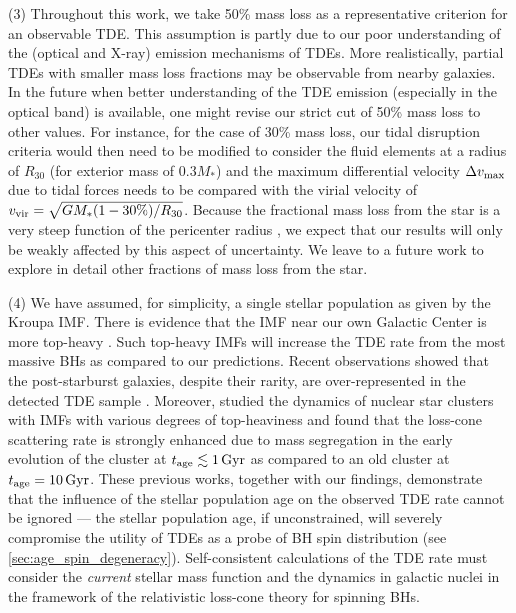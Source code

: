 \documentclass[useAMS,usenatbib]{mn2e}
\def\mstar{M_*}
\def\tage{t_{\rm age}}
\begin{document}
(3) Throughout this work, we take 50\% mass loss as a representative criterion for an observable TDE. This assumption is partly due to our poor understanding of the (optical and X-ray) emission mechanisms of TDEs. More realistically, partial TDEs with smaller mass loss fractions may be observable from nearby galaxies. In the future when better understanding of the TDE emission (especially in the optical band) is available, one might revise our strict cut of 50\% mass loss to other values. For instance, for the case of 30\% mass loss, our tidal disruption criteria would then need to be modified to consider the fluid elements at a radius of $R_{30}$ (for exterior mass of $0.3\mstar$) and the maximum differential velocity $\Delta v_{\rm max}$ due to tidal forces needs to be compared with the virial velocity of $v_{\rm vir} = \sqrt{GM_*(1-30\%)/R_{30}}$. Because the fractional mass loss from the star is a very steep function of the pericenter radius \citep{guillochon13_TDE_hydro, Ryu2020a}, we expect that our results will only be weakly affected by this aspect of uncertainty. We leave to a future work to explore in detail other fractions of mass loss from the star.

(4) We have assumed, for simplicity, a single stellar population as given by the Kroupa IMF. There is evidence that the IMF near our own Galactic Center is more top-heavy \citep{lu13_top_heavy_IMF}. Such top-heavy IMFs will increase the TDE rate from the most massive BHs as compared to our predictions. Recent observations showed that the post-starburst galaxies, despite their rarity, are over-represented in the detected TDE sample \citep{French2020,Hammerstein2021}. Moreover, \cite{Bortolas2022} studied the dynamics of nuclear star clusters with IMFs with various degrees of top-heaviness and found that the loss-cone scattering rate is strongly enhanced due to mass segregation in the early evolution of the cluster at $\tage\lesssim 1\rm\, Gyr$ as compared to an old cluster at $\tage=10\rm\, Gyr$. These previous works, together with our findings, demonstrate that the influence of the stellar population age on the observed TDE rate cannot be ignored --- the stellar population age, if unconstrained, will severely compromise the utility of TDEs as a probe of BH spin distribution (see \ref{sec:age_spin_degeneracy}). Self-consistent calculations of the TDE rate must consider the \textit{current} stellar mass function and the dynamics in galactic nuclei in the framework of the relativistic loss-cone theory for spinning BHs.
\end{document}
